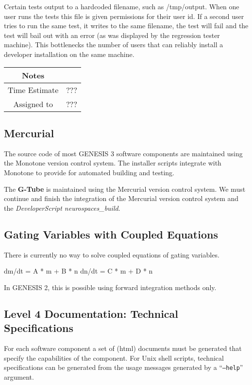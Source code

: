 \documentclass[12pt]{article}
\begin{document}
Certain tests output to a hardcoded filename, such as /tmp/output.
When one user runs the tests this file is given permissions for their
user id. If a second user tries to run the same test, it writes to the
same filename, the test will fail and the test will bail out with an
error (as was displayed by the regression tester machine).  This
bottlenecks the number of users that can reliably install a developer
installation on the same machine.


{
  \vspace{5mm}
  \centering
  \begin{tabular}{|c|c|}
    \hline
    Notes
    &  \\
    \hline
    Time Estimate
    & ??? \\
    \hline
    Assigned to
    & ??? \\
    \hline
  \end{tabular}
}


\subsection{Mercurial}

The source code of most GENESIS 3 software components are maintained
using the Monotone version control system.  The installer scripts
integrate with Monotone to provide for automated building and testing.

The {\bf G-Tube} is maintained using the Mercurial version control system.
We must continue and finish the integration of the Mercurial version
control system and the {\it DeveloperScript neurospaces\_build}.


\subsection{Gating Variables with Coupled Equations}

There is currently no way to solve coupled equations of gating
variables.

dm/dt = A * m + B * n
dn/dt = C * m + D * n

In GENESIS 2, this is possible using forward integration methods only.


\subsection{Level 4 Documentation: Technical Specifications}

For each software component a set of (html) documents must be
generated that specify the capabilities of the component.  For Unix
shell scripts, technical specifications can be generated from the
usage messages generated by a ``{\tt --help}'' argument.
\end{document}

